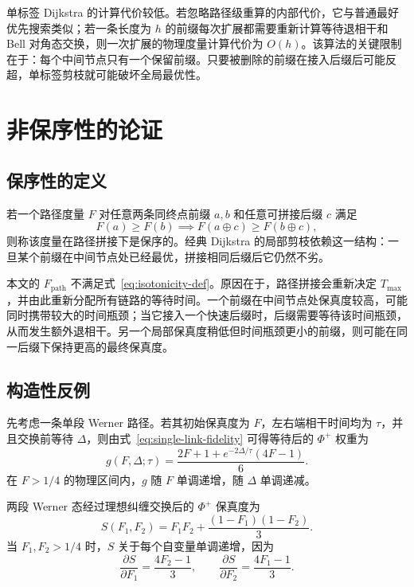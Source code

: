 单标签 Dijkstra 的计算代价较低。若忽略路径级重算的内部代价，它与普通最好优先搜索类似；若一条长度为 $h$ 的前缀每次扩展都需要重新计算等待退相干和 Bell 对角态交换，则一次扩展的物理度量计算代价为 $O(h)$。该算法的关键限制在于：每个中间节点只有一个保留前缀。只要被删除的前缀在接入后缀后可能反超，单标签剪枝就可能破坏全局最优性。

\section{非保序性的论证}
\label{sec:non-isotonicity}

\subsection{保序性的定义}

若一个路径度量 $F$ 对任意两条同终点前缀 $a,b$ 和任意可拼接后缀 $c$ 满足
\begin{equation}
  F(a) \ge F(b)
  \implies
  F(a\oplus c) \ge F(b\oplus c),
  \label{eq:isotonicity-def}
\end{equation}
则称该度量在路径拼接下是保序的。经典 Dijkstra 的局部剪枝依赖这一结构：一旦某个前缀在中间节点处已经最优，拼接相同后缀后它仍然不劣。

本文的 $F_{\mathrm{path}}$ 不满足式~\eqref{eq:isotonicity-def}。原因在于，路径拼接会重新决定 $T_{\max}$，并由此重新分配所有链路的等待时间。一个前缀在中间节点处保真度较高，可能同时携带较大的时间瓶颈；当它接入一个快速后缀时，后缀需要等待该时间瓶颈，从而发生额外退相干。另一个局部保真度稍低但时间瓶颈更小的前缀，则可能在同一后缀下保持更高的最终保真度。

\subsection{构造性反例}

先考虑一条单段 Werner 路径。若其初始保真度为 $F$，左右端相干时间均为 $\tau$，并且交换前等待 $\Delta$，则由式~\eqref{eq:single-link-fidelity} 可得等待后的 $\Phi^+$ 权重为
\begin{equation}
  g(F,\Delta;\tau)
  =
  \frac{2F + 1 + e^{-2\Delta/\tau}(4F - 1)}{6}.
  \label{eq:waited-werner-fidelity}
\end{equation}
在 $F>1/4$ 的物理区间内，$g$ 随 $F$ 单调递增，随 $\Delta$ 单调递减。

两段 Werner 态经过理想纠缠交换后的 $\Phi^+$ 保真度为
\begin{equation}
  S(F_1,F_2)
  =
  F_1F_2 + \frac{(1-F_1)(1-F_2)}{3}.
  \label{eq:werner-swap}
\end{equation}
当 $F_1,F_2>1/4$ 时，$S$ 关于每个自变量单调递增，因为
\[
  \frac{\partial S}{\partial F_1}
  =
  \frac{4F_2 - 1}{3},
  \qquad
  \frac{\partial S}{\partial F_2}
  =
  \frac{4F_1 - 1}{3}.
\]

